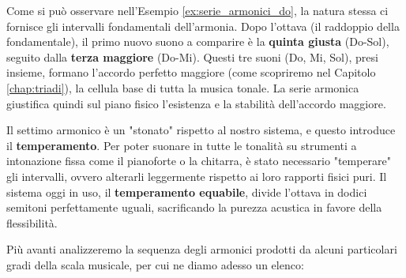 Come si può osservare nell'Esempio \ref{ex:serie_armonici_do}, la natura stessa ci fornisce gli intervalli fondamentali dell'armonia. Dopo l'ottava (il raddoppio della fondamentale), il primo nuovo suono a comparire è la \textbf{quinta giusta} (Do-Sol), seguito dalla \textbf{terza maggiore} (Do-Mi). Questi tre suoni (Do, Mi, Sol), presi insieme, formano l'accordo perfetto maggiore (come scopriremo nel Capitolo \ref{chap:triadi}), la cellula base di tutta la musica tonale. La serie armonica giustifica quindi sul piano fisico l'esistenza e la stabilità dell'accordo maggiore.

Il settimo armonico è un \Sibemolle  "stonato" rispetto al nostro sistema, e questo introduce il \textbf{temperamento}. Per poter suonare in tutte le tonalità su strumenti a intonazione fissa come il pianoforte o la chitarra, è stato necessario "temperare" gli intervalli, ovvero alterarli leggermente rispetto ai loro rapporti fisici puri. Il sistema oggi in uso, il \textbf{temperamento equabile}, divide l'ottava in dodici semitoni perfettamente uguali, sacrificando la purezza acustica in favore della flessibilità.

Più avanti analizzeremo la sequenza degli armonici prodotti da alcuni particolari gradi della scala musicale, per cui ne diamo adesso un elenco:


